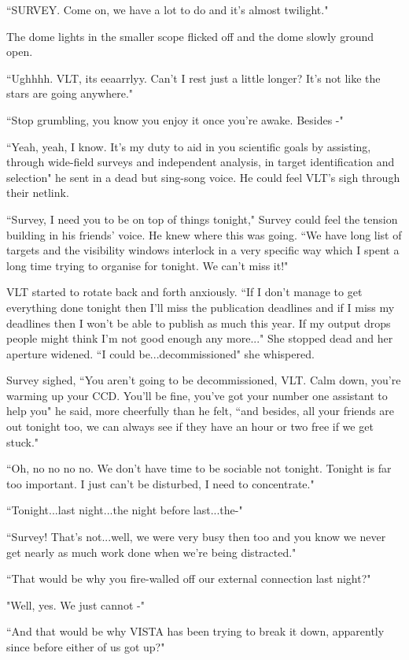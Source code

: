 \documentclass[12pt]{iopart}
\begin{document}
``SURVEY. Come on, we have a lot to do and it's almost twilight."

The dome lights in the smaller scope flicked off and the dome slowly ground open.

``Ughhhh. VLT, its eeaarrlyy. Can't I rest just a little longer? It's not like the stars are going anywhere."

``Stop grumbling, you know you enjoy it once you're awake. Besides -"

``Yeah, yeah, I know. It's my duty to aid in you scientific goals by assisting, through wide-field surveys and independent analysis, in target identification and selection" he sent in a dead but sing-song voice. He could feel VLT's sigh through their netlink.

``Survey, I need you to be on top of things tonight," Survey could feel the tension building in his friends' voice. He knew where this was going. ``We have long list of targets and the visibility windows interlock in a very specific way which I spent a long time trying to organise for tonight. We can't miss it!"

VLT started to rotate back and forth anxiously. ``If I don't manage to get everything done tonight then I'll miss the publication deadlines and if I miss my deadlines then I won't be able to publish as much this year. If my output drops people might think I'm not good enough any more..." She stopped dead and her aperture widened. ``I could be...decommissioned" she whispered.

Survey sighed, ``You aren't going to be decommissioned, VLT. Calm down, you're warming up your CCD. You'll be fine, you've got your number one assistant to help you" he said, more cheerfully than he felt, ``and besides, all your friends are out tonight too, we can always see if they have an hour or two free if we get stuck."

``Oh, no no no no. We don't have time to be sociable not tonight. Tonight is far too important. I just can't be disturbed, I need to concentrate."

``Tonight...last night...the night before last...the-"

``Survey! That's not...well, we were very busy then too and you know we never get nearly as much work done when we're being distracted."

``That would be why you fire-walled off our external connection last night?"

"Well, yes. We just cannot -"

``And that would be why VISTA has been trying to break it down, apparently since before either of us got up?"
\end{document}
